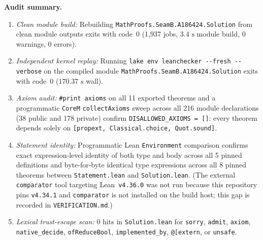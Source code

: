 \documentclass[11pt]{article}
\theoremstyle{definition}
\begin{document}
\noindent\textbf{Audit summary.}
\begin{enumerate}\setlength{\itemsep}{2pt}
\item \emph{Clean module build:} Rebuilding \nolinkurl{MathProofs.SeamB.A186424.Solution} from clean module outputs exits with code~$0$ (1{,}937 jobs, $3.4\text{ s}$ module build, $0$ warnings, $0$ errors).
\item \emph{Independent kernel replay:} Running \texttt{lake env leanchecker -{}-fresh -{}-verbose} on the compiled module \nolinkurl{MathProofs.SeamB.A186424.Solution} exits with code~$0$ ($170.37\text{ s}$ wall).
\item \emph{Axiom audit:} \texttt{\#print axioms} on all 11 exported theorems and a programmatic \texttt{CoreM} \texttt{collectAxioms} sweep across all 216 module declarations (38 public and 178 private) confirm \texttt{DISALLOWED\_AXIOMS = []}: every theorem depends solely on \texttt{[propext, Classical.choice, Quot.sound]}.
\item \emph{Statement identity:} Programmatic Lean \texttt{Environment} comparison confirms exact expression-level identity of both type and body across all 5 pinned definitions and byte-for-byte identical type expressions across all 8 pinned theorems between \texttt{Statement.lean} and \texttt{Solution.lean}. (The external \texttt{comparator} tool targeting Lean~\texttt{v4.36.0} was not run because this repository pins \texttt{v4.34.1} and \texttt{comparator} is not installed on the build host; this gap is recorded in \texttt{VERIFICATION.md}.)
\item \emph{Lexical trust-escape scan:} $0$ hits in \texttt{Solution.lean} for \texttt{sorry}, \texttt{admit}, \texttt{axiom}, \texttt{native\_decide}, \texttt{ofReduceBool}, \texttt{implemented\_by}, \texttt{@[extern}, or \texttt{unsafe}.
\end{enumerate}
\end{document}
